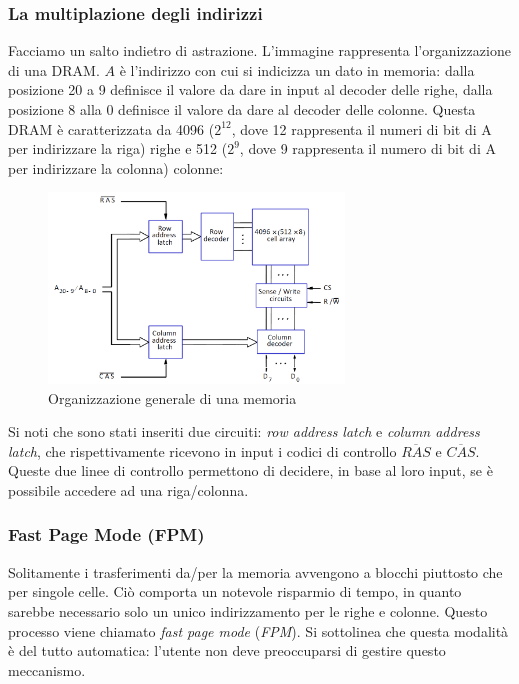 \documentclass[class=book, crop=false, oneside]{standalone}
\begin{document}
\subsubsection{La multiplazione degli indirizzi}
Facciamo un salto indietro di astrazione. L'immagine rappresenta l'organizzazione di una DRAM. \(A\) è l'indirizzo con cui si indicizza un dato in memoria: dalla posizione 20 a 9 definisce il valore da dare in input al decoder delle righe, dalla posizione 8 alla 0 definisce il valore da dare al decoder delle colonne. Questa DRAM è caratterizzata da 4096 (\(2^{12}\), dove 12 rappresenta il numeri di bit di A per indirizzare la riga) righe e 512 (\(2^9\), dove 9 rappresenta il numero di bit di A per indirizzare la colonna) colonne:
\begin{figure}[H]
	\centering
	\includegraphics[width=0.7\textwidth,keepaspectratio]{organizzazione_generale.png}
	\caption{Organizzazione generale di una memoria}
\end{figure}
Si noti che sono stati inseriti due circuiti: \emph{row address latch} e \emph{column address latch}, che rispettivamente ricevono in input i codici di controllo \emph{\(\overline{RAS}\)} e \emph{\(\overline{CAS}\)}. Queste due linee di controllo permettono di decidere, in base al loro input, se è possibile accedere ad una riga/colonna.

\subsubsection{Fast Page Mode (FPM)}\label{sec:FPM}
Solitamente i trasferimenti da/per la memoria avvengono a blocchi piuttosto che per singole celle. Ciò comporta un notevole risparmio di tempo, in quanto sarebbe necessario solo un unico indirizzamento per le righe e colonne. Questo processo viene chiamato \emph{fast page mode} (\emph{FPM}). Si sottolinea che questa modalità è del tutto automatica: l'utente non deve preoccuparsi di gestire questo meccanismo.
\end{document}
